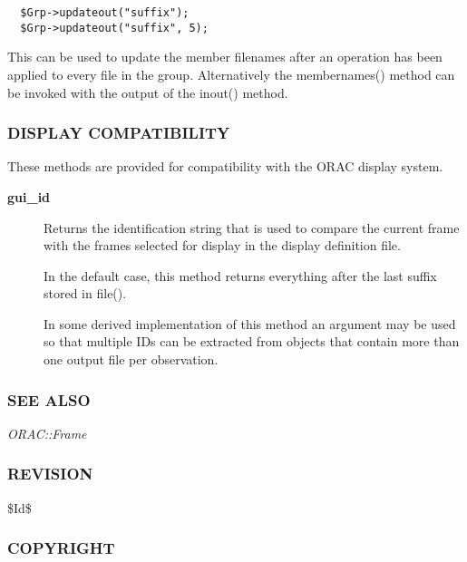 \begin{description}
\begin{description}
\begin{description}
\begin{verbatim}
  $Grp->updateout("suffix");
  $Grp->updateout("suffix", 5);
\end{verbatim}


This can be used to update the member filenames after an operation
has been applied to every file in the group. Alternatively the
membernames() method can be invoked with the output of the inout()
method.

\end{description}
\subsubsection*{DISPLAY COMPATIBILITY\label{ORAC::Group_DISPLAY_COMPATIBILITY}}


These methods are provided for compatibility with the ORAC display
system.

\begin{description}

\item[{\textbf{gui\_id}}] \mbox{}

Returns the identification string that is used to compare the
current frame with the frames selected for display in the
display definition file.



In the default case, this method returns everything after the
last suffix stored in file().



In some derived implementation of this method an argument
may be used so that multiple IDs can be extracted from objects
that contain more than one output file per observation.

\end{description}
\subsubsection*{SEE ALSO\label{ORAC::Group_SEE_ALSO}}


\emph{ORAC::Frame}

\subsubsection*{REVISION\label{ORAC::Group_REVISION}}


\$Id\$

\subsubsection*{COPYRIGHT\label{ORAC::Group_COPYRIGHT}}



\end{description}
\end{description}
